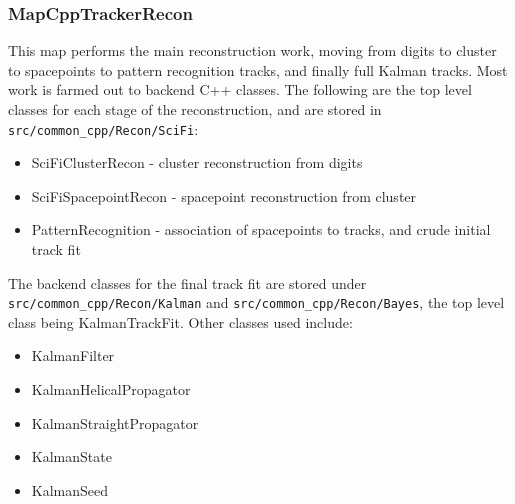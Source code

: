 \subsubsection{MapCppTrackerRecon}
This map performs the main reconstruction work, moving from digits to cluster to spacepoints to pattern recognition tracks, and finally full Kalman tracks. Most work is farmed out to backend C++ classes. The following are the top level classes for each stage of the reconstruction, and are stored in \verb;src/common_cpp/Recon/SciFi;:

\begin{itemize}
 \item SciFiClusterRecon - cluster reconstruction from digits
 \item SciFiSpacepointRecon - spacepoint reconstruction from cluster
 \item PatternRecognition - association of spacepoints to tracks, and crude initial track fit
\end{itemize}

The backend classes for the final track fit are stored under \verb;src/common_cpp/Recon/Kalman; and  \verb;src/common_cpp/Recon/Bayes;, the top level class being KalmanTrackFit.  Other classes used include:

\begin{itemize}
 \item KalmanFilter
 \item KalmanHelicalPropagator
 \item KalmanStraightPropagator
 \item KalmanState
 \item KalmanSeed
\end{itemize}



